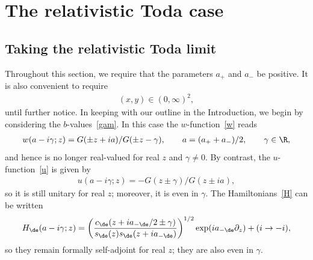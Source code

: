 \documentclass[pdftex]{sigma}
\numberwithin{equation}{section}
\begin{document}
\section{The relativistic Toda case}\label{section5}

\subsection{Taking the relativistic Toda limit}\label{section5.1}

Throughout this section, we require that the parameters $a_+$ and $a_-$ be positive. It is also convenient to require
\begin{gather}\label{xyp}
(x,y)\in(0,\infty)^2,
\end{gather}
until further notice.
In keeping with our outline in the Introduction, we begin by considering the $b$-values~\eqref{gam}. In this case the $w$-function~\eqref{w} reads
\begin{gather}\label{wmod}
w(a-i\gamma;z)=G(\pm z +ia)/G(\pm z -\gamma),\qquad a=(a_{+}+a_{-})/2,\qquad \gamma\in\R,
\end{gather}
and hence is no longer real-valued for real $z$ and $\gamma\ne 0$. By contrast, the $u$-function~\eqref{u} is given by
\begin{gather}\label{ug}
u(a-i\gamma;z)=-G(z\pm \gamma)/G(z\pm ia),
\end{gather}
so it is still unitary for real $z$; moreover, it is even in $\gamma$. The Hamiltonians~\eqref{H} can be written
\begin{gather}
H_{\de}(a-i\gamma;z)=\left(\frac{c_{\de}(z+ia_{-\de}/2\pm\gamma)}{s_{\de}(z)s_{\de}(z+ia_{-\de})}\right)^{1/2}\exp(ia_{-\de}\partial_z)+(i\to -i),
\end{gather} so they remain formally self-adjoint for real $z$; they are also  even in $\gamma$.
\end{document}
